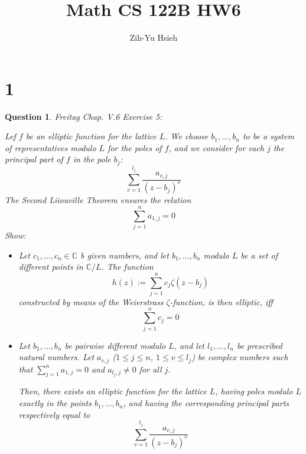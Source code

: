 \documentclass{article}
\title{Math CS 122B HW6}
\author{Zih-Yu Hsieh}
\newtheorem{question}{Question}
\begin{document}
\maketitle

\section*{1}
\begin{myBox}[]{}
    \begin{question}
        Freitag Chap. V.6 Exercise 5:

        Lef $f$ be an elliptic function for the lattice $L$. We choose $b_1,...,b_n$ to be a system of representatives modulo $L$ for the poles of $f$, and we consider for each $j$ the principal part of $f$ in the pole $b_j$:
        $$\sum_{v=1}^{l_j}\frac{a_{v,j}}{(z-b_j)^v}$$
        The Second Liiouville Theorem ensures the relation 
        $$\sum_{j=1}^{n}a_{1,j}=0$$
        Show:
        \begin{itemize}
            \item[(a)] Let $c_1,...,c_n\in\mathbb{C}$ b given numbers, and let $b_1,...,b_n$ modulo $L$ be a set of different points in $\mathbb{C}/L$. The function 
            $$h(z):=\sum_{j=1}^{n}c_j\zeta(z-b_j)$$
            constructed by means of the Weierstrass $\zeta$-function, is then elliptic, iff 
            $$\sum_{j=1}^{n}c_j=0$$
            \item[(b)] Let $b_1,...,b_n$ be pairwise different modulo $L$, and let $l_1,...,l_n$ be prescribed natural numbers. Let $a_{v,j}$ ($1\leq j\leq n$, $1\leq v\leq l_j$) be complex numbers such that $\sum_{j=1}^{n}a_{1,j}=0$ and $a_{l_j,j}\neq 0$ for all $j$.
            
            Then, there exists an elliptic function for the lattice $L$, having poles modulo $L$ exactly in the points $b_1,...,b_n$, and having the corresponding principal parts respectively equal to 
            $$\sum_{v=1}^{l_j}\frac{a_{v,j}}{(z-b_j)^v}$$
        \end{itemize}
    \end{question}
\end{myBox}
\end{document}
